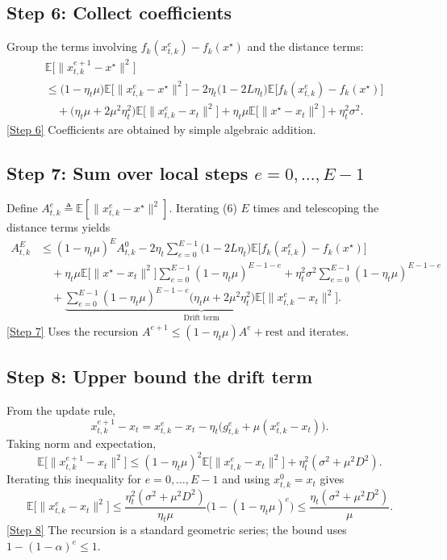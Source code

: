\documentclass{article}
\newcommand{\E}{\mathbb{E}}
\begin{document}
\subsection*{Step 6: Collect coefficients}
Group the terms involving $f_k(x_{t,k}^{e})-f_k(x^\star)$ and the distance terms:
\begin{align}
    &\E\!\bigl[\|x_{t,k}^{e+1}-x^\star\|^2\bigr] \nonumber\\
    &\le \bigl(1-\eta_t\mu\bigr)\E\!\bigl[\|x_{t,k}^{e}-x^\star\|^2\bigr]
       -2\eta_t\bigl(1-2L\eta_t\bigr)\E\!\bigl[f_k(x_{t,k}^{e})-f_k(x^\star)\bigr] \nonumber\\
    &\quad +\bigl(\eta_t\mu+2\mu^2\eta_t^2\bigr)\E\!\bigl[\|x_{t,k}^{e}-x_t\|^2\bigr]
       +\eta_t\mu\E\!\bigl[\|x^\star-x_t\|^2\bigr]
       +\eta_t^2\sigma^2 . \tag{6}
\end{align}
\noindent\underline{[Step 6]} Coefficients are obtained by simple algebraic addition.

\subsection*{Step 7: Sum over local steps $e=0,\dots,E-1$}
Define $A_{t,k}^{e}\triangleq\E[\|x_{t,k}^{e}-x^\star\|^2]$.
Iterating (6) $E$ times and telescoping the distance terms yields
\begin{align}
    A_{t,k}^{E}
    &\le (1-\eta_t\mu)^E A_{t,k}^{0}
        -2\eta_t\sum_{e=0}^{E-1}\bigl(1-2L\eta_t\bigr)\E\!\bigl[f_k(x_{t,k}^{e})-f_k(x^\star)\bigr] \nonumber\\
    &\quad +\eta_t\mu\E\!\bigl[\|x^\star-x_t\|^2\bigr]\sum_{e=0}^{E-1}(1-\eta_t\mu)^{E-1-e}
        +\eta_t^2\sigma^2\sum_{e=0}^{E-1}(1-\eta_t\mu)^{E-1-e} \nonumber\\
    &\quad +\underbrace{\sum_{e=0}^{E-1}(1-\eta_t\mu)^{E-1-e}
        \bigl(\eta_t\mu+2\mu^2\eta_t^2\bigr)
        \E\!\bigl[\|x_{t,k}^{e}-x_t\|^2\bigr]}_{\displaystyle \text{Drift term}} . \tag{7}
\end{align}
\noindent\underline{[Step 7]} Uses the recursion $A^{e+1}\le (1-\eta_t\mu)A^{e}+ \text{rest}$ and iterates.

\subsection*{Step 8: Upper bound the drift term}
From the update rule,
\[
    x_{t,k}^{e+1}-x_t
    =x_{t,k}^{e}-x_t-\eta_t\bigl(g_{t,k}^{e}+\mu(x_{t,k}^{e}-x_t)\bigr) .
\]
Taking norm and expectation,
\[
    \E\!\bigl[\|x_{t,k}^{e+1}-x_t\|^2\bigr]
    \le (1-\eta_t\mu)^2\E\!\bigl[\|x_{t,k}^{e}-x_t\|^2\bigr]
          +\eta_t^2(\sigma^2+\mu^2 D^2) .
\]
Iterating this inequality for $e=0,\dots,E-1$ and using $x_{t,k}^{0}=x_t$ gives
\[
    \E\!\bigl[\|x_{t,k}^{e}-x_t\|^2\bigr]\le \frac{\eta_t^2(\sigma^2+\mu^2 D^2)}{\eta_t\mu}
        \bigl(1-(1-\eta_t\mu)^{e}\bigr)
    \le \frac{\eta_t(\sigma^2+\mu^2 D^2)}{\mu} . \tag{8}
\]
\noindent\underline{[Step 8]} The recursion is a standard geometric series; the bound uses $1-(1-\alpha)^e\le1$.
\end{document}
